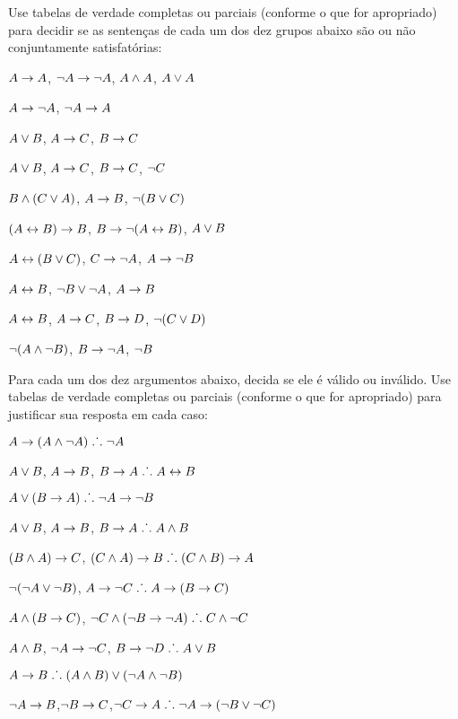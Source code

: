 \noindent\problempart
\label{pr.TT.satisfiable5}
Use tabelas de verdade completas ou parciais (conforme o que for apropriado) para decidir se as sentenças de cada um dos dez grupos abaixo são ou não conjuntamente satisfatórias:
\begin{earg}
\item $A\rightarrow A$, $\neg A \rightarrow \neg A$, $A\wedge A$, $A\vee A$ %
\item $A \rightarrow \neg A$, $\neg A \rightarrow A$%
\item $A\vee B$, $A\rightarrow C$, $B\rightarrow C$ %
\item $A \vee B$, $A \rightarrow C$, $B \rightarrow C$, $\neg C$ %
\item $B\wedge(C\vee A)$, $A\rightarrow B$, $\neg(B\vee C)$  %
\item $(A \leftrightarrow B) \rightarrow B$,  $B \rightarrow \neg (A \leftrightarrow B)$, $A \vee B$  %
\item $A\leftrightarrow(B\vee C)$, $C\rightarrow \neg A$, $A\rightarrow \neg B$ %
\item  $A \leftrightarrow B$,  $\neg B \vee \neg A$,  $A \rightarrow  B$ %
\item $A \leftrightarrow B$, $A \rightarrow C$, $B \rightarrow D$, $\neg(C \vee D)$ %
\item $\neg (A \wedge \neg B)$,  $B \rightarrow \neg A$, $\neg B$   %
\end{earg}

\noindent\problempart 
Para cada um dos dez argumentos abaixo, decida se ele é válido ou inválido.
Use tabelas de verdade completas ou parciais (conforme o que for apropriado) para justificar sua resposta em cada caso:
\label{pr.TT.valid5} 
\begin{earg}
\item $A\rightarrow(A\wedge\neg A)\mathrel{\ldotp\dot{}\,\ldotp} \neg A$%
\item $A \vee B$, $A \rightarrow B$, $B \rightarrow A \mathrel{\ldotp\dot{}\,\ldotp}  A \leftrightarrow B$  %
\item $A\vee(B\rightarrow A)\mathrel{\ldotp\dot{}\,\ldotp} \neg A \rightarrow \neg B$ %
\item $A \vee B$, $A \rightarrow B$, $ B \rightarrow A \mathrel{\ldotp\dot{}\,\ldotp}  A \wedge B$ %
\item $(B\wedge A)\rightarrow C$, $(C\wedge A)\rightarrow B\mathrel{\ldotp\dot{}\,\ldotp} (C\wedge B)\rightarrow A$ %
\item $\neg (\neg A \vee \neg B)$, $A \rightarrow \neg C \mathrel{\ldotp\dot{}\,\ldotp}  A \rightarrow (B \rightarrow C)$ %
\item $A \wedge (B \rightarrow C)$, $\neg C \wedge (\neg B \rightarrow \neg A)\mathrel{\ldotp\dot{}\,\ldotp} C \wedge \neg C$ %
\item $A \wedge B$, $\neg A \rightarrow \neg C$, $B \rightarrow \neg D \mathrel{\ldotp\dot{}\,\ldotp}  A \vee B$ %
\item $A \rightarrow B\mathrel{\ldotp\dot{}\,\ldotp} (A \wedge B) \vee (\neg A \wedge \neg B)$ %
\item $\neg A \rightarrow B$,$ \neg B \rightarrow C $,$ \neg C \rightarrow A \mathrel{\ldotp\dot{}\,\ldotp}  \neg A \rightarrow (\neg B \vee \neg C) $%

\end{earg}

